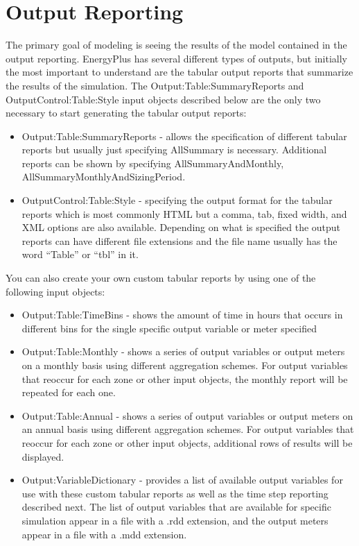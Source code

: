 \section{Output Reporting}

The primary goal of modeling is seeing the results of the model contained
in the output reporting. EnergyPlus has several different types of
outputs, but initially the most important to understand are the tabular
output reports that summarize the results of the simulation. The Output:Table:SummaryReports
and OutputControl:Table:Style input objects described below are the
only two necessary to start generating the tabular output reports:
\begin{itemize}
\item Output:Table:SummaryReports - allows the specification of different
tabular reports but usually just specifying AllSummary is necessary.
Additional reports can be shown by specifying AllSummaryAndMonthly,
AllSummaryMonthlyAndSizingPeriod.
\item OutputControl:Table:Style - specifying the output format for the tabular
reports which is most commonly HTML but a comma, tab, fixed width,
and XML options are also available. Depending on what is specified
the output reports can have different file extensions and the file
name usually has the word ``Table'' or ``tbl'' in it.
\end{itemize}
You can also create your own custom tabular reports by using one of
the following input objects:
\begin{itemize}
\item Output:Table:TimeBins - shows the amount of time in hours that occurs
in different bins for the single specific output variable or meter
specified
\item Output:Table:Monthly - shows a series of output variables or output
meters on a monthly basis using different aggregation schemes. For
output variables that reoccur for each zone or other input objects,
the monthly report will be repeated for each one.
\item Output:Table:Annual - shows a series of output variables or output
meters on an annual basis using different aggregation schemes. For
output variables that reoccur for each zone or other input objects,
additional rows of results will be displayed.
\item Output:VariableDictionary - provides a list of available output variables
for use with these custom tabular reports as well as the time step
reporting described next. The list of output variables that are available
for specific simulation appear in a file with a .rdd extension, and
the output meters appear in a file with a .mdd extension.
\end{itemize}
